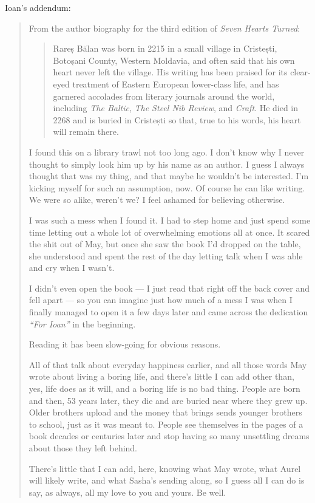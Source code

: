 Ioan's addendum:

\begin{quote}
From the author biography for the third edition of \emph{Seven Hearts Turned}:

\begin{quote}
Rareș Bălan was born in 2215 in a small village in Cristești, Botoșani County, Western Moldavia, and often said that his own heart never left the village. His writing has been praised for its clear-eyed treatment of Eastern European lower-class life, and has garnered accolades from literary journals around the world, including \emph{The Baltic}, \emph{The Steel Nib Review}, and \emph{Craft}. He died in 2268 and is buried in Cristești so that, true to his words, his heart will remain there.
\end{quote}

I found this on a library trawl not too long ago. I don't know why I never thought to simply look him up by his name as an author. I guess I always thought that was my thing, and that maybe he wouldn't be interested. I'm kicking myself for such an assumption, now. Of course he can like writing. We were so alike, weren't we? I feel ashamed for believing otherwise.

I was such a mess when I found it. I had to step home and just spend some time letting out a whole lot of overwhelming emotions all at once. It scared the shit out of May, but once she saw the book I'd dropped on the table, she understood and spent the rest of the day letting talk when I was able and cry when I wasn't.

I didn't even open the book — I just read that right off the back cover and fell apart — so you can imagine just how much of a mess I was when I finally managed to open it a few days later and came across the dedication \emph{``For Ioan''} in the beginning.

Reading it has been slow-going for obvious reasons.

All of that talk about everyday happiness earlier, and all those words May wrote about living a boring life, and there's little I can add other than, yes, life does as it will, and a boring life is no bad thing. People are born and then, 53 years later, they die and are buried near where they grew up. Older brothers upload and the money that brings sends younger brothers to school, just as it was meant to. People see themselves in the pages of a book decades or centuries later and stop having so many unsettling dreams about those they left behind.

There's little that I can add, here, knowing what May wrote, what Aurel will likely write, and what Sasha's sending along, so I guess all I can do is say, as always, all my love to you and yours. Be well.
\end{quote}
